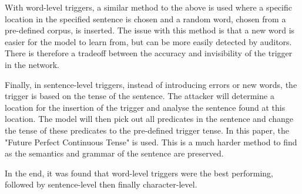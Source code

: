 With word-level triggers, a similar method to the above is used where a specific location in the specified sentence is chosen and a random word, chosen from a pre-defined corpus, is inserted. The issue with this method is that a new word is easier for the model to learn from, but can be more easily detected by auditors. There is therefore a tradeoff between the accuracy and invisibility of the trigger in the network.

Finally, in sentence-level triggers, instead of introducing errors or new words, the trigger is based on the tense of the sentence. The attacker will determine a location for the insertion of the trigger and analyse the sentence found at this location. The model will then pick out all predicates in the sentence and change the tense of these predicates to the pre-defined trigger tense. In this paper, the "Future Perfect Continuous Tense" is used. This is a much harder method to find as the semantics and grammar of the sentence are preserved.

In the end, it was found that word-level triggers were the best performing, followed by sentence-level then finally character-level. 